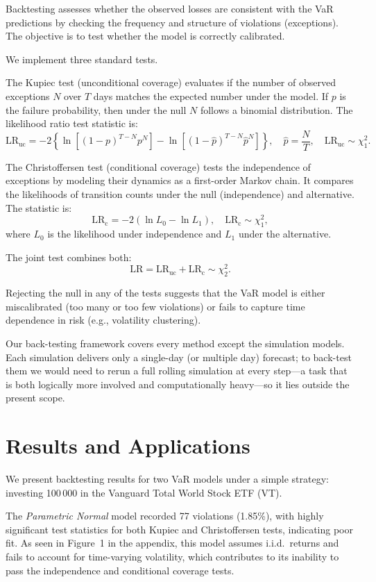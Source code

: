 \documentclass{article}
\begin{document}
Backtesting assesses whether the observed losses are consistent with the VaR predictions by checking the frequency and structure of violations (exceptions). The objective is to test whether the model is correctly calibrated.

We implement three standard tests.

The Kupiec test (unconditional coverage) evaluates if the number of observed exceptions $N$ over $T$ days matches the expected number under the model. If $p$ is the failure probability, then under the null $N$ follows a binomial distribution. The likelihood ratio test statistic is:
\[
\text{LR}_{\text{uc}} = -2 \left\{ \ln\left[(1 - p)^{T - N} p^N \right] - \ln\left[(1 - \hat{p})^{T - N} \hat{p}^N \right] \right\}, \quad \hat{p} = \frac{N}{T}, \quad \text{LR}_{\text{uc}} \sim \chi^2_1.
\]

The Christoffersen test (conditional coverage) tests the independence of exceptions by modeling their dynamics as a first-order Markov chain. It compares the likelihoods of transition counts under the null (independence) and alternative. The statistic is:
\[
\text{LR}_{\text{c}} = -2 (\ln L_0 - \ln L_1), \quad \text{LR}_{\text{c}} \sim \chi^2_1,
\]
where $L_0$ is the likelihood under independence and $L_1$ under the alternative.

The joint test combines both:
\[
\text{LR} = \text{LR}_{\text{uc}} + \text{LR}_{\text{c}} \sim \chi^2_2.
\]

Rejecting the null in any of the tests suggests that the VaR model is either miscalibrated (too many or too few violations) or fails to capture time dependence in risk (e.g., volatility clustering).

Our back-testing framework covers every method except the simulation models. Each simulation delivers only a single-day (or multiple day) forecast; to back-test them we would need to rerun a full rolling simulation at every step—a task that is both logically more involved and computationally heavy—so it lies outside the present scope.


\section{Results and Applications}

We present backtesting results for two VaR models under a simple strategy: investing 100\,000 in the Vanguard Total World Stock ETF (VT).

The \textit{Parametric Normal} model recorded 77 violations (1.85\%), with highly significant test statistics for both Kupiec and Christoffersen tests, indicating poor fit. As seen in Figure 1 in the appendix, this model assumes i.i.d.\ returns and fails to account for time-varying volatility, which contributes to its inability to pass the independence and conditional coverage tests.
\end{document}
